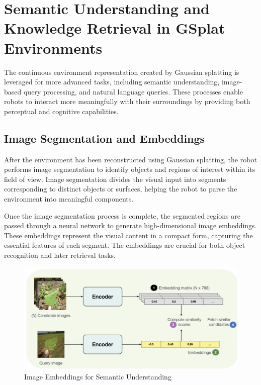 \section{Semantic Understanding and Knowledge Retrieval in GSplat Environments}

The continuous environment representation created by Gaussian splatting is
leveraged for more advanced tasks, including semantic understanding,
image-based query processing, and natural language queries. These processes
enable robots to interact more meaningfully with their surroundings by
providing both perceptual and cognitive capabilities.\cite{che2024enhancingmultimodalunderstandingclipbased}

\subsection{Image Segmentation and Embeddings}

After the environment has been reconstructed using Gaussian splatting, the
robot performs image segmentation to identify objects and regions of interest
within its field of view. Image segmentation divides the visual input into
segments corresponding to distinct objects or surfaces, helping the robot to
parse the environment into meaningful components. \cite{ravi2024sam}

Once the image segmentation process is complete, the segmented regions are
passed through a neural network to generate high-dimensional image embeddings.
These embeddings represent the visual content in a compact form, capturing the
essential features of each segment. The embeddings are crucial for both object
recognition and later retrieval tasks. \cite{che2024enhancingmultimodalunderstandingclipbased}

\begin{figure}[h]
      \centering
      \includegraphics[width=\textwidth]{embeddings.png} %
      \caption{Image Embeddings for Semantic Understanding} %
      \label{fig:embeddings} %
\end{figure}

